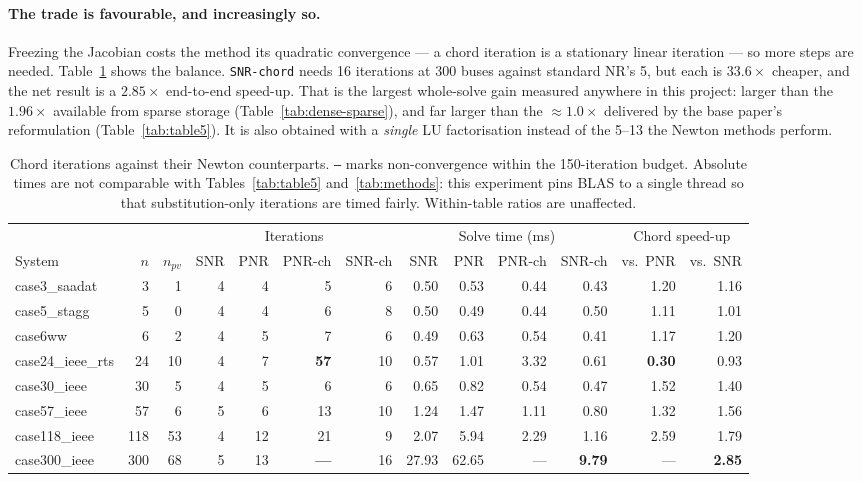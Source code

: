\documentclass[sigconf,nonacm]{acmart}
\begin{document}
\paragraph{The trade is favourable, and increasingly so.}
Freezing the Jacobian costs the method its quadratic convergence --- a chord
iteration is a stationary linear iteration --- so more steps are needed.
Table~\ref{tab:chord} shows the balance. \texttt{SNR-chord} needs 16 iterations
at 300 buses against standard NR's 5, but each is $33.6\times$ cheaper, and the
net result is a \textbf{$2.85\times$} end-to-end speed-up. That is the largest
whole-solve gain measured anywhere in this project: larger than the $1.96\times$
available from sparse storage (Table~\ref{tab:dense-sparse}), and far larger
than the $\approx\!1.0\times$ delivered by the base paper's reformulation
(Table~\ref{tab:table5}). It is also obtained with a \emph{single} LU
factorisation instead of the 5--13 the Newton methods perform.

\begin{table}[t]
\centering
\caption{Chord iterations against their Newton counterparts. \texttt{---} marks
non-convergence within the 150-iteration budget. Absolute times are not
comparable with Tables~\ref{tab:table5} and~\ref{tab:methods}: this experiment
pins BLAS to a single thread so that substitution-only iterations are timed
fairly. Within-table ratios are unaffected.}
\label{tab:chord}
\footnotesize
\setlength{\tabcolsep}{4pt}
\begin{tabular}{l r r r r r r r r r r r r}
\toprule
& & & \multicolumn{4}{c}{Iterations} & \multicolumn{4}{c}{Solve time (ms)} & \multicolumn{2}{c}{Chord speed-up} \\
\cmidrule(lr){4-7}\cmidrule(lr){8-11}\cmidrule(lr){12-13}
System & $n$ & $n_{pv}$ & SNR & PNR & PNR-ch & SNR-ch & SNR & PNR & PNR-ch & SNR-ch
& vs.\ PNR & vs.\ SNR \\
\midrule
case3\_saadat     & 3   & 1  & 4 & 4  & 5  & 6  & 0.50  & 0.53  & 0.44 & 0.43 & 1.20 & 1.16 \\
case5\_stagg      & 5   & 0  & 4 & 4  & 6  & 8  & 0.50  & 0.49  & 0.44 & 0.50 & 1.11 & 1.01 \\
case6ww           & 6   & 2  & 4 & 5  & 7  & 6  & 0.49  & 0.63  & 0.54 & 0.41 & 1.17 & 1.20 \\
case24\_ieee\_rts & 24  & 10 & 4 & 7  & \textbf{57} & 10 & 0.57 & 1.01 & 3.32 & 0.61 & \textbf{0.30} & 0.93 \\
case30\_ieee      & 30  & 5  & 4 & 5  & 6  & 6  & 0.65  & 0.82  & 0.54 & 0.47 & 1.52 & 1.40 \\
case57\_ieee      & 57  & 6  & 5 & 6  & 13 & 10 & 1.24  & 1.47  & 1.11 & 0.80 & 1.32 & 1.56 \\
case118\_ieee     & 118 & 53 & 4 & 12 & 21 & 9  & 2.07  & 5.94  & 2.29 & 1.16 & 2.59 & 1.79 \\
case300\_ieee     & 300 & 68 & 5 & 13 & \textbf{---} & 16 & 27.93 & 62.65 & --- & \textbf{9.79} & --- & \textbf{2.85} \\
\bottomrule
\end{tabular}
\end{table}
\end{document}
